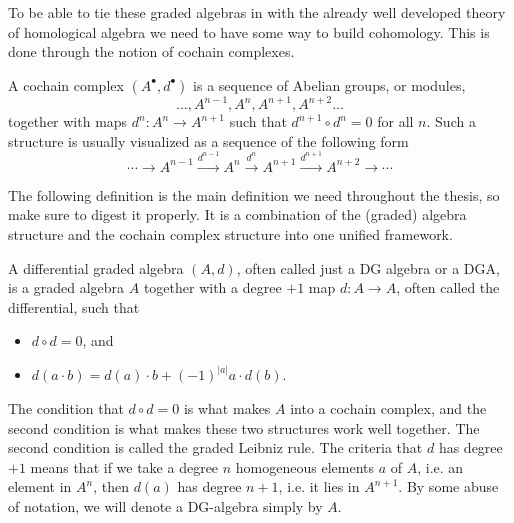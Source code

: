To be able to tie these graded algebras in with the already well developed theory of homological algebra we need to have some way to build cohomology. This is done through the notion of cochain complexes. 

\begin{definition}
A cochain complex $(A^{\bullet}, d^{\bullet})$ is a sequence of Abelian groups, or modules,
\begin{equation*}
    \ldots, A^{n-1}, A^n, A^{n+1}, A^{n+2}\ldots
\end{equation*}
together with maps $d^n:A^n\rightarrow A^{n+1}$ such that $d^{n+1}\circ d^n = 0$ for all $n$. Such a structure is usually visualized as a sequence of the following form
\begin{equation*}
    \cdots\longrightarrow A^{n-1} \overset{d^{n-1}}\longrightarrow A^n \overset{d^n}\longrightarrow A^{n+1} \overset{d^{n+1}}\longrightarrow A^{n+2}\longrightarrow\cdots
\end{equation*}
\end{definition}

The following definition is the main definition we need throughout the thesis, so make sure to digest it properly. It is a combination of the (graded) algebra structure and the cochain complex structure into one unified framework. 

\begin{definition}
A differential graded algebra $(A, d)$, often called just a DG algebra or a DGA, is a graded algebra $A$ together with a degree $+1$ map $d: A\rightarrow A$, often called the differential, such that 
\begin{itemize}
    \item $d\circ d = 0$, and
    \item $d(a\cdot b) = d(a)\cdot b + (-1)^{|a|}a\cdot d(b)$. 
\end{itemize}
\end{definition}

The condition that $d\circ d = 0$ is what makes $A$ into a cochain complex, and the second condition is what makes these two structures work well together. The second condition is called the graded Leibniz rule. The criteria that $d$ has degree $+1$ means that if we take a degree $n$ homogeneous elements $a$ of $A$, i.e. an element in $A^n$, then $d(a)$ has degree $n+1$, i.e. it lies in $A^{n+1}$. By some abuse of notation, we will denote a DG-algebra simply by $A$.

